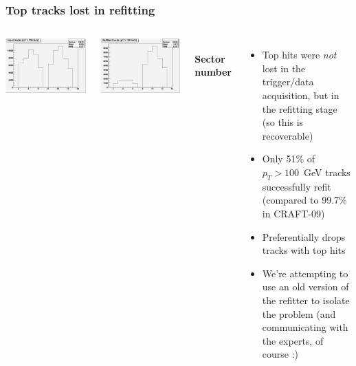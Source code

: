\documentclass[compress]{beamer}
\begin{document}
\begin{frame}
\frametitle{Top tracks lost in refitting}

\begin{columns}

\includegraphics[width=\linewidth]{hits_i2_10.png}

\includegraphics[width=\linewidth]{hits_r2_10.png}

\mbox{ } \hfill {\bf Sector number} \hfill \mbox{ }

\begin{itemize}
\item Top hits were {\it not} lost in the trigger/data acquisition, but in the refitting stage (so this is recoverable)

\item Only 51\% of $p_T > 100$~GeV tracks successfully refit (compared to 99.7\% in CRAFT-09)

\item Preferentially drops tracks with top hits

\item We're attempting to use an old version of the refitter to isolate the problem (and communicating with the experts, of course :)
\end{itemize}

\end{columns}
\end{frame}
\end{document}
